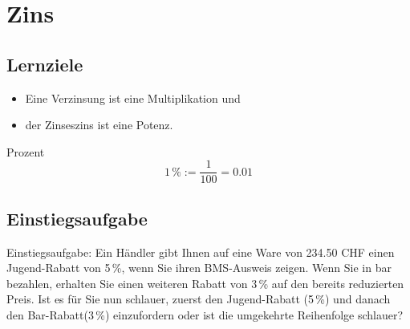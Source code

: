 
\newpage
\section{Zins}

\subsection*{Lernziele}

\begin{itemize}
  \item Eine Verzinsung ist eine  Multiplikation und
  \item der Zinseszins ist eine Potenz.

\end{itemize}

\begin{definition}{Prozent}{}\index{$\%$}
$$1\,\% := \frac1{100} = 0.01$$
\end{definition}

\subsection{Einstiegsaufgabe}
Einstiegsaufgabe:
Ein Händler gibt Ihnen auf eine Ware von 234.50 CHF einen Jugend-Rabatt von
5\,\%, wenn Sie ihren BMS-Ausweis zeigen. Wenn Sie in bar bezahlen, erhalten Sie
einen weiteren Rabatt von 3\,\% auf den bereits reduzierten Preis.
Ist es für Sie nun schlauer, zuerst den
Jugend-Rabatt (5\,\%) und danach den Bar-Rabatt(3\,\%) einzufordern oder
ist die umgekehrte Reihenfolge schlauer?



